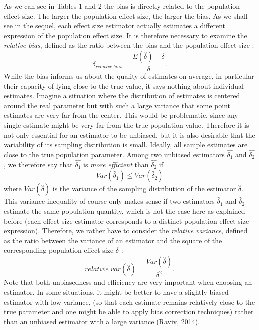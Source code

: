 \documentclass[
  english,
  man,floatsintext]{apa6}
\begin{document}
As we can see in Tables 1 and 2 the bias is directly related to the population effect size. The larger the population effect size, the larger the bias. As we shall see in the sequel, each effect size estimator actually estimates a different expression of the population effect size. It is therefore necessary to examine the \emph{relative bias}, defined as the ratio between the bias and the population effect size :
\begin{equation} 
\delta_{relative \; bias}=\frac{E(\hat{\delta})-\delta}{\delta}.
\label{eqn:RELBIAS}
\end{equation}
While the bias informs us about the quality of estimates on average, in particular their capacity of lying close to the true value, it says nothing about individual estimates. Imagine a situation where the distribution of estimates is centered around the real parameter but with such a large variance that some point estimates are very far from the center. This would be problematic, since any single estimate might be very far from the true population value. Therefore it is not only essential for an estimator to be unbiased, but it is also desirable that the variability of its sampling distribution is small. Ideally, all sample estimates are close to the true population parameter. Among two unbiased estimators \(\hat{\delta_1}\) and \(\hat{\delta_2}\), we therefore say that \(\hat{\delta_1}\) is \emph{more efficient} than \(\hat{\delta_2}\) if
\begin{equation} 
Var(\hat{\delta}_1) \leq Var(\hat{\delta}_2)
\label{eqn:EFFICIENCY}
\end{equation}
where \(Var(\hat{\delta})\) is the variance of the sampling distribution of the estimator \(\hat{\delta}\). This variance inequality of course only makes sense if two estimators \(\hat{\delta}_1\) and \(\hat{\delta}_2\) estimate the same population quantity, which is not the case here as explained before (each effect size estimator corresponds to a distinct population effect size expression). Therefore, we rather have to consider the \emph{relative variance}, defined as the ratio between the variance of an estimator and the square of the corresponding population effect size \(\delta\) :
\begin{equation} 
relative \; var(\hat{\delta})=\frac{Var(\hat{\delta})}{\delta^2}.
\label{eqn:RELVAR}
\end{equation}
Note that both unbiasedness and efficiency are very important when choosing an estimator. In some situations, it might be better to have a slightly biased estimator with low variance, (so that each estimate remains relatively close to the true parameter and one might be able to apply bias correction techniques) rather than an unbiased estimator with a large variance (Raviv, 2014).
\end{document}
